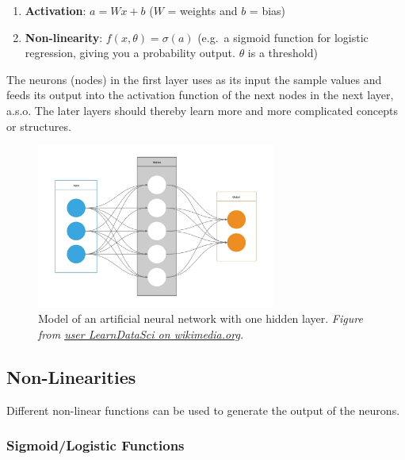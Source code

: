 \documentclass[
]{book}
\begin{document}
\begin{enumerate}
\def\labelenumi{\arabic{enumi}.}
\item
  \textbf{Activation}: \(a = Wx+b\) (\(W\) = weights and \(b\) = bias)
\item
  \textbf{Non-linearity}: \(f(x, \theta)=\sigma(a)\) (e.g.~a sigmoid function
  for logistic regression, giving you a probability output. \(\theta\)
  is a threshold)
\end{enumerate}

The neurons (nodes) in the first layer uses as its input the sample
values and feeds its output into the activation function of the next
nodes in the next layer, a.s.o. The later layers should thereby learn
more and more complicated concepts or structures.

\begin{figure}
\hypertarget{CDF}{%
\centering
\includegraphics[width=0.7\textwidth,height=\textheight]{./figures/Artificial_Neural_Network.jpg}
\caption{Model of an artificial neural network with one hidden layer. \emph{Figure
from \href{https://commons.wikimedia.org/wiki/File:Artificial_Neural_Network.jpg}{user LearnDataSci on
wikimedia.org}.}}\label{CDF}
}
\end{figure}

\hypertarget{non-linearities}{%
\subsection{Non-Linearities}\label{non-linearities}}

Different non-linear functions can be used to generate the output of the
neurons.

\hypertarget{sigmoidlogistic-functions}{%
\subsubsection{Sigmoid/Logistic Functions}\label{sigmoidlogistic-functions}}
\end{document}
